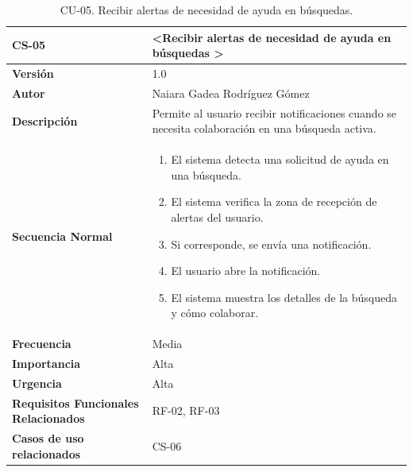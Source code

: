 \begin{table}[htbp] %
\centering
\begin{tabular}{ |m{3cm}|m{11cm}|  } 
\hline
\cellcolor[HTML]{B9E3F0}\centering\textbf{CS-05} & \cellcolor[HTML]{B9E3F0}\textbf{\textless Recibir alertas de necesidad de ayuda en búsquedas \textgreater}\\

\hline
\cellcolor[HTML]{EFEFEF}\textbf{Versión}             & 1.0  \\
\hline
\cellcolor[HTML]{EFEFEF}\textbf{Autor}                & Naiara Gadea Rodríguez Gómez\\
\hline
\cellcolor[HTML]{EFEFEF}\textbf{Descripción}                & { Permite al usuario recibir notificaciones cuando se necesita colaboración en una búsqueda activa. }\\
\hline
\cellcolor[HTML]{EFEFEF}\textbf{Secuencia \newline Normal}                &                 
        \begin{enumerate}
            \item El sistema detecta una solicitud de ayuda en una búsqueda.
            \item El sistema verifica la zona de recepción de alertas del usuario.
            \item Si corresponde, se envía una notificación.
            \item El usuario abre la notificación.
            \item El sistema muestra los detalles de la búsqueda y cómo colaborar.
        \end{enumerate}\\
\hline
\cellcolor[HTML]{EFEFEF}\textbf{Frecuencia}                & Media\\
\hline
\cellcolor[HTML]{EFEFEF}\textbf{Importancia}                & Alta\\
\hline
\cellcolor[HTML]{EFEFEF}\textbf{Urgencia}                & Alta\\
\hline
\cellcolor[HTML]{EFEFEF}\textbf{Requisitos Funcionales Relacionados}                & { RF-02, RF-03  }\\
\hline
\cellcolor[HTML]{EFEFEF}\textbf{Casos de uso relacionados}                & { CS-06 }\\
\hline
\end{tabular}
\caption{CU-05. Recibir alertas de necesidad de ayuda en búsquedas.}
\end{table}


